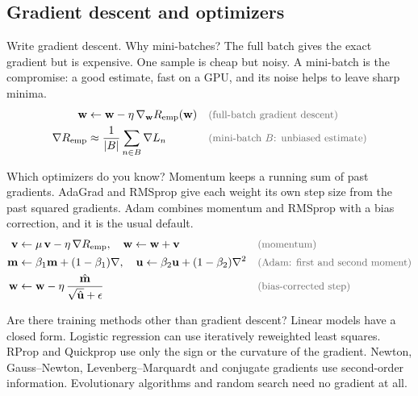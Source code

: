 \subsection{Gradient descent and optimizers}

\begin{qabox}{Write gradient descent. Why mini-batches?}
\explain The full batch gives the exact gradient but is expensive. One sample is cheap but noisy.
A mini-batch is the compromise: a good estimate, fast on a GPU, and its noise helps to leave sharp
minima.
\derive
\begin{align*}
\mathbf{w} &\leftarrow \mathbf{w} - \eta\,\nabla_{\mathbf{w}}\Remp(\mathbf{w}) \why{full-batch gradient descent} \\
\nabla\Remp &\approx \frac{1}{\lvert B\rvert}\sum_{n\in B}\nabla L_n \why{mini-batch $B$: unbiased estimate}
\end{align*}
\end{qabox}

\begin{qabox}{Which optimizers do you know?}
\explain Momentum keeps a running sum of past gradients. AdaGrad and RMSprop give each weight its own
step size from the past squared gradients. Adam combines momentum and RMSprop with a bias
correction, and it is the usual default.
\derive
\begin{align*}
\mathbf{v} &\leftarrow \mu\,\mathbf{v} - \eta\,\nabla\Remp,\quad \mathbf{w} \leftarrow \mathbf{w} + \mathbf{v} \why{momentum} \\
\mathbf{m} &\leftarrow \beta_1\mathbf{m} + (1-\beta_1)\nabla,\quad \mathbf{u} \leftarrow \beta_2\mathbf{u} + (1-\beta_2)\nabla^2 \why{Adam: first and second moment} \\
\mathbf{w} &\leftarrow \mathbf{w} - \eta\,\frac{\hat{\mathbf{m}}}{\sqrt{\hat{\mathbf{u}}} + \epsilon} \why{bias-corrected step}
\end{align*}
\end{qabox}

\begin{qabox}{Are there training methods other than gradient descent?}
\explain Linear models have a closed form. Logistic regression can use iteratively reweighted least
squares. RProp and Quickprop use only the sign or the curvature of the gradient. Newton,
Gauss--Newton, Levenberg--Marquardt and conjugate gradients use second-order information.
Evolutionary algorithms and random search need no gradient at all.
\end{qabox}

